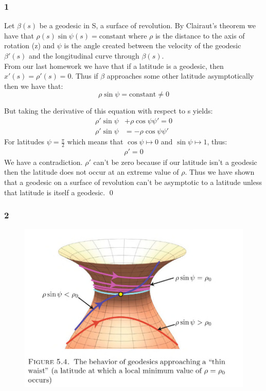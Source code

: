 \documentclass[a4paper, 11pt]{article}
\begin{document}
	\subsubsection*{1}
	Let $\beta(s)$ be a geodesic in S, a surface of revolution. By Clairaut's theorem we have that $\rho(s)\sin\psi(s) = \text{constant}$ where $\rho$ is the distance to the axis of rotation (z) and $\psi$ is the angle created between the velocity of the geodesic $\beta'(s)$ and the longitudinal curve through $\beta(s)$. \\
	
	\noindent From our last homework we have that if a latitude is a geodesic, then $x'(s) = \rho'(s) = 0$. Thus if $\beta$ approaches some other latitude asymptotically then we have that: 
		\begin{equation*}
			\rho\sin\psi = \text{constant} \neq 0
		\end{equation*}
	
	But taking the derivative of this equation with respect to s yields:\
		\begin{align*}
			\rho'\sin\psi &+ \rho\cos\psi \psi' = 0 \\ 
			\rho'\sin\psi &= -\rho\cos\psi \psi' 
		\end{align*}
	For latitudes $\psi = \frac{\pi}{2}$ which means that $\cos\psi \mapsto 0$ and $\sin\psi \mapsto 1$, thus: 
		\begin{align*}
			\rho' = 0
		\end{align*}
	We have a contradiction. $\rho'$ can't be zero because if our latitude isn't a geodesic then the latitude does not occur at an extreme value of $\rho$. Thus we have shown that a geodesic on a surface of revolution can't be asymptotic to a latitude unless that latitude is itself a geodesic. \qed 
	\subsubsection*{2}
		\begin{figure}[!hbt]
			\centering
			\includegraphics[scale = 0.75]{5-4}		
		\end{figure}
	
\end{document}
